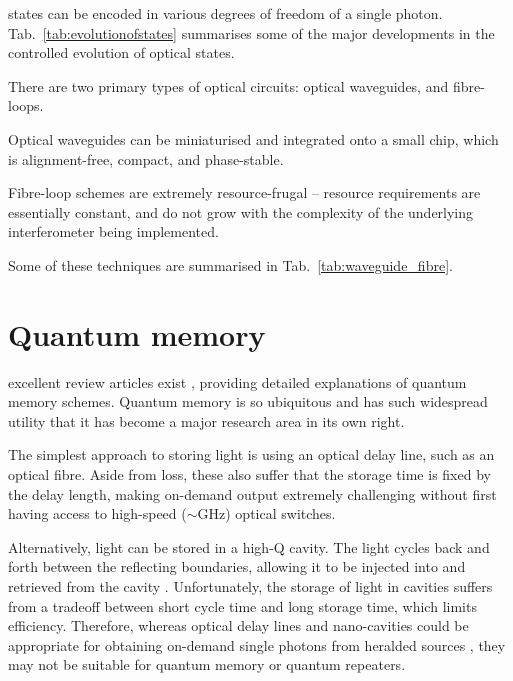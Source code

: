  states can be encoded in various degrees of freedom of a single photon. Tab.~\ref{tab:evolutionofstates} summarises some of the major developments in the controlled evolution of optical states.

There are two primary types of optical circuits: optical waveguides, and fibre-loops.

Optical waveguides can be miniaturised and integrated onto a small chip, which is alignment-free, compact, and phase-stable.

Fibre-loop schemes are extremely resource-frugal -- resource requirements are essentially constant, and do not grow with the complexity of the underlying interferometer being implemented. 

Some of these techniques are summarised in Tab.~\ref{tab:waveguide_fibre}.

%
%

\section{Quantum memory} 

 excellent review articles exist \cite{bib:lvovsky2009optical, bib:simon2010quantum, bib:sangouard2011quantum, bib:bussieres2013prospective, bib:reiserer2015cavity}, providing detailed explanations of quantum memory schemes. Quantum memory is so ubiquitous and has such widespread utility that it has become a major research area in its own right.

The simplest approach to storing light is using an optical delay line, such as an optical fibre. Aside from loss, these also suffer that the storage time is fixed by the delay length, making on-demand output extremely challenging without first having access to high-speed ($\sim$GHz) optical switches.

Alternatively, light can be stored in a high-Q cavity. The light cycles back and forth between the reflecting boundaries, allowing it to be injected into and retrieved from the cavity \cite{bib:pittman2002single, bib:pittman2002cyclical, bib:leung2006quantum, bib:maitre1997quantum, bib:tanabe2007trapping, bib:tanabe2009dynamic}. Unfortunately, the storage of light in cavities suffers from a tradeoff between short cycle time and long storage time, which limits efficiency. Therefore, whereas optical delay lines and nano-cavities could be appropriate for obtaining on-demand single photons from heralded sources \cite{bib:saglamyurek2015quantum, bib:jin2015telecom}, they may not be suitable for quantum memory or quantum repeaters.

